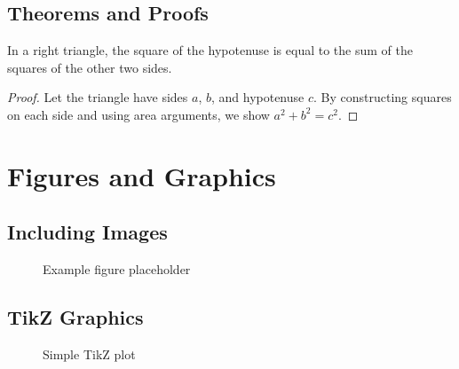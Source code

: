 \documentclass{article}
\begin{document}
\subsection{Theorems and Proofs}
\begin{theorem}
In a right triangle, the square of the hypotenuse is equal to the sum of the squares of the other two sides.
\end{theorem}

\begin{proof}
Let the triangle have sides $a$, $b$, and hypotenuse $c$. By constructing squares on each side and using area arguments, we show $a^2 + b^2 = c^2$.
\end{proof}

\section{Figures and Graphics}
\subsection{Including Images}
\begin{figure}[H]
    \centering
    \caption{Example figure placeholder}
    \label{fig:example}
\end{figure}

\subsection{TikZ Graphics}
\begin{figure}[H]
    \centering
    \caption{Simple TikZ plot}
    \label{fig:tikz}
\end{figure}
\end{document}
